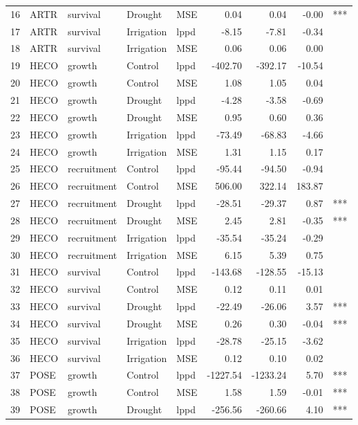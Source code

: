 \begin{longtable}{rllllrrrl}
  16 & ARTR & survival & Drought & MSE & 0.04 & 0.04 & -0.00 & *** \\ 
  17 & ARTR & survival & Irrigation & lppd & -8.15 & -7.81 & -0.34 &  \\ 
  18 & ARTR & survival & Irrigation & MSE & 0.06 & 0.06 & 0.00 &  \\ 
  19 & HECO & growth & Control & lppd & -402.70 & -392.17 & -10.54 &  \\ 
  20 & HECO & growth & Control & MSE & 1.08 & 1.05 & 0.04 &  \\ 
  21 & HECO & growth & Drought & lppd & -4.28 & -3.58 & -0.69 &  \\ 
  22 & HECO & growth & Drought & MSE & 0.95 & 0.60 & 0.36 &  \\ 
  23 & HECO & growth & Irrigation & lppd & -73.49 & -68.83 & -4.66 &  \\ 
  24 & HECO & growth & Irrigation & MSE & 1.31 & 1.15 & 0.17 &  \\ 
  25 & HECO & recruitment & Control & lppd & -95.44 & -94.50 & -0.94 &  \\ 
  26 & HECO & recruitment & Control & MSE & 506.00 & 322.14 & 183.87 &  \\ 
  27 & HECO & recruitment & Drought & lppd & -28.51 & -29.37 & 0.87 & *** \\ 
  28 & HECO & recruitment & Drought & MSE & 2.45 & 2.81 & -0.35 & *** \\ 
  29 & HECO & recruitment & Irrigation & lppd & -35.54 & -35.24 & -0.29 &  \\ 
  30 & HECO & recruitment & Irrigation & MSE & 6.15 & 5.39 & 0.75 &  \\ 
  31 & HECO & survival & Control & lppd & -143.68 & -128.55 & -15.13 &  \\ 
  32 & HECO & survival & Control & MSE & 0.12 & 0.11 & 0.01 &  \\ 
  33 & HECO & survival & Drought & lppd & -22.49 & -26.06 & 3.57 & *** \\ 
  34 & HECO & survival & Drought & MSE & 0.26 & 0.30 & -0.04 & *** \\ 
  35 & HECO & survival & Irrigation & lppd & -28.78 & -25.15 & -3.62 &  \\ 
  36 & HECO & survival & Irrigation & MSE & 0.12 & 0.10 & 0.02 &  \\ 
  37 & POSE & growth & Control & lppd & -1227.54 & -1233.24 & 5.70 & *** \\ 
  38 & POSE & growth & Control & MSE & 1.58 & 1.59 & -0.01 & *** \\ 
  39 & POSE & growth & Drought & lppd & -256.56 & -260.66 & 4.10 & *** \\ 

\end{longtable}
